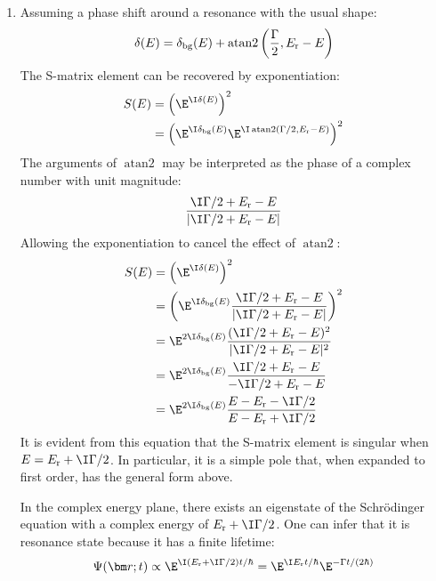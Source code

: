 \documentclass[fleqn, 12pt]{article}
\begin{document}
\begin{enumerate}
\item Assuming a phase shift around a resonance with the usual shape:
  \begin{align*}
    \delta(E) = \delta_{\text{bg}}(E) +
    \operatorname{atan2}\left(\frac{\Gamma}{2}, E_{\text r} - E\right)
  \end{align*}
  The S-matrix element can be recovered by exponentiation:
  \begin{align*}
    S(E)
    &= \left(\E^{\I \delta(E)}\right)^2 \\
    &= \left(\E^{\I \delta_{\text{bg}}(E)}
      \E^{\I \operatorname{atan2}(\Gamma / 2, E_{\text r} - E)}\right)^2
  \end{align*}
  The arguments of $\operatorname{atan2}$ may be interpreted as the phase of a
  complex number with unit magnitude:
  \begin{align*}
    \frac{\I \Gamma / 2 + E_{\text r} - E}{
    |\I \Gamma / 2 + E_{\text r} - E|}
  \end{align*}
  Allowing the exponentiation to cancel the effect of $\operatorname{atan2}$:
  \begin{align*}
    S(E)
    &= \left(\E^{\I \delta(E)}\right)^2 \\
    &= \left(\E^{\I \delta_{\text{bg}}(E)}
      \frac{\I \Gamma / 2 + E_{\text r} - E}{
      |\I \Gamma / 2 + E_{\text r} - E|}\right)^2 \\
    &= \E^{2 \I \delta_{\text{bg}}(E)}
      \frac{(\I \Gamma / 2 + E_{\text r} - E)^2}{
      |\I \Gamma / 2 + E_{\text r} - E|^2} \\
    &= \E^{2 \I \delta_{\text{bg}}(E)}
      \frac{\I \Gamma / 2 + E_{\text r} - E}{
      -\I \Gamma / 2 + E_{\text r} - E} \\
    &= \E^{2 \I \delta_{\text{bg}}(E)}
      \frac{E - E_{\text r} - \I \Gamma / 2}{
      E - E_{\text r} + \I \Gamma / 2}
  \end{align*}
  It is evident from this equation that the S-matrix element is singular when
  $E = E_{\text r} + \I \Gamma / 2$.  In particular, it is a simple pole that,
  when expanded to first order, has the general form above.

  In the complex energy plane, there exists an eigenstate of the Schr\"odinger
  equation with a complex energy of $E_{\text r} + \I \Gamma / 2$.  One can
  infer that it is resonance state because it has a finite lifetime:
  \begin{align*}
    \Psi(\bm r; t) \propto \E^{\I (E_{\text r} + \I \Gamma / 2) t / \hbar}
    = \E^{\I E_{\text r} t / \hbar} \E^{-\Gamma t / (2 \hbar)}
  \end{align*}


\end{enumerate}
\end{document}
